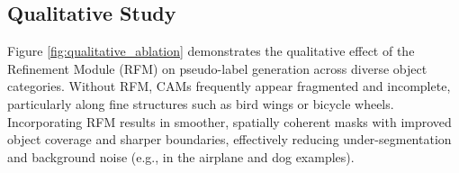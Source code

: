 \subsection{Qualitative Study}

Figure \ref{fig:qualitative_ablation} demonstrates the qualitative effect of the Refinement Module (RFM) on pseudo-label generation across diverse object categories. Without RFM, CAMs frequently appear fragmented and incomplete, particularly along fine structures such as bird wings or bicycle wheels. Incorporating RFM results in smoother, spatially coherent masks with improved object coverage and sharper boundaries, effectively reducing under-segmentation and background noise (e.g., in the airplane and dog examples). 

\begin{figure}[H]
  \centering
  \setlength{\tabcolsep}{0.5pt} %
  \renewcommand{\arraystretch}{0.4}


\end{figure}
